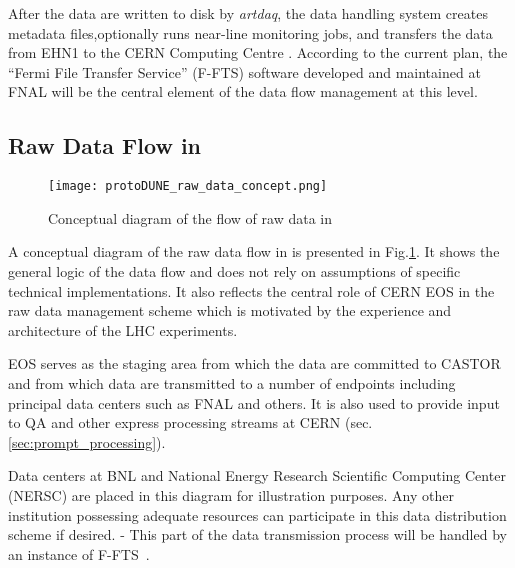 
After the data are written to disk by {\it artdaq}, the data handling
system creates metadata files,optionally  runs near-line monitoring jobs, and
transfers the data from EHN1 to the CERN Computing Centre \cite{docdb1212}.
According to the current plan, the ``Fermi File Transfer Service'' (F-FTS) software 
developed and maintained at FNAL will be the central element
of the data flow management at this level.


\subsection{Raw Data Flow in \pd}
\label{sec:raw_concept}
\begin{figure}[tbh]
\centering\texttt{[image: protoDUNE\_raw\_data\_concept.png]}
\caption{\label{fig:raw_concept}Conceptual diagram of the flow of raw data in \pd}
\end{figure}

A conceptual diagram of the raw data flow in \pd is presented in Fig.\ref{fig:raw_concept}. It shows the general logic
of the data flow and does not rely on assumptions of specific technical implementations. 
It also reflects the central role of CERN EOS in the \pd raw data management scheme which is motivated by the experience
and architecture of the LHC experiments.

EOS serves as the staging area from which the data are committed to CASTOR
and from which data are transmitted to a number of endpoints including principal data centers such as FNAL and others.
It is also used to provide input to QA and other express processing streams at CERN (sec.\,\ref{sec:prompt_processing}).

Data centers at BNL and National Energy Research Scientific Computing Center (NERSC)
are placed in this diagram for illustration purposes. Any other institution possessing adequate
resources can participate in this data distribution scheme if desired.
-
 This part of the data transmission process will be handled by an instance of F-FTS~\cite{docdb1212}.



